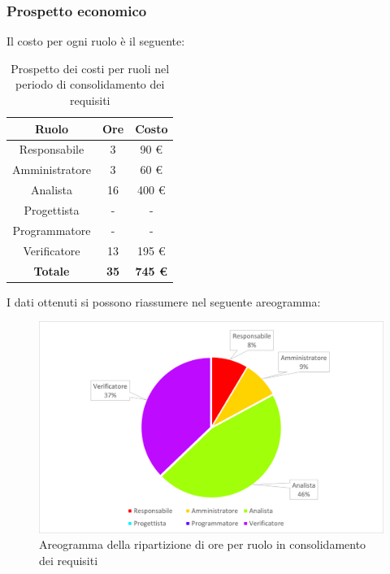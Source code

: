 \subsubsection{Prospetto economico}
Il costo per ogni ruolo è il seguente:
\begin{table}[H]
		\begin{center}
			\setlength{\aboverulesep}{0pt}
			\setlength{\belowrulesep}{0pt}
			\setlength{\extrarowheight}{.75ex}
			\begin{tabular}{ c c c }
				\rowcolor{AzzurroGruppo!30} 
				\textbf{Ruolo} & \textbf{Ore} & \textbf{Costo}  \\
				\toprule
				Responsabile   & 3 & 90 \euro \\
				Amministratore & 3 & 60 \euro \\
				Analista       & 16 & 400 \euro \\
				Progettista    & - & - \\
				Programmatore  & - & - \\
				Verificatore   & 13 & 195 \euro \\
				\textbf{Totale} & \textbf{35} & \textbf{745 \euro} \\
				\bottomrule
			\end{tabular}
			\caption{ Prospetto dei costi per ruoli nel periodo di consolidamento dei requisiti}
		\end{center}
	\end{table}
I dati ottenuti si possono riassumere nel seguente areogramma:
\begin{figure}[H]
    \centering
    \includegraphics[scale = 0.5]{components/img/Analisi-consolidamento-torta.png}
    \caption{ Areogramma della ripartizione di ore per ruolo in consolidamento dei requisiti}
    \label{fig:Areogramma ripartizione ore, fase di consolidamento dei requisiti}
\end{figure}
